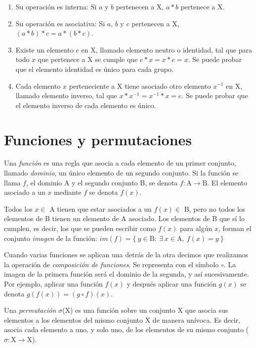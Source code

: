 		\begin{enumerate}
			\item{Su operación es interna: Si $a$ y $b$ pertenecen a X, $a\ast b$ pertenece a X.}		\item{Su operación es asociativa: Si $a$, $b$ y $c$ pertenecen a X, $(a\ast b)\ast c=a\ast(b\ast c)$. }
			\item{Existe un elemento $e$ en X, llamado elemento neutro o identidad, tal que para todo $x$ que pertenece a X se cumple que $e\ast x = x\ast e = x$. Se puede probar que el elemento identidad es único para cada grupo.}
			\item{Cada elemento $x$ perteneciente a X tiene asociado otro elemento $x^{-1}$ en X, llamado elemento inverso, tal que $x \ast x^{-1} = x^{-1}  \ast x = e$. Se puede probar que el elemento inverso de cada elemento es único.}		
		\end{enumerate}
	
	\section{Funciones y permutaciones}
		Una \emph{función} es una regla que asocia a cada elemento de un primer conjunto, llamado \emph{dominio}, un único elemento de un segundo conjunto. Si la función se llama $f$, el dominio A y el segundo conjunto B, se denota $f:\text{A}\to \text{B}$. El elemento asociado a un $x$ mediante $f$ se denota $f(x)$.
		
		Todos los $x\in$ A tienen que estar asociados a un $f(x)\in$ B, pero no todos los elementos de B tienen un elemento de A asociado. Los elementos de B que sí lo cumplen, es decir, los que se pueden escribir como $f(x)$ para algún $x$, forman el conjunto \emph{imagen} de la función: $im(f)=\{\ y\in \text{B}:\ \exists\ x \in \text{A},\ f(x)=y\ \}$
		
		Cuando varias funciones se aplican una detrás de la otra decimos que realizamos la operación de \textit{composición de funciones}. Se representa con el símbolo $\circ$. La imagen de la primera función será el dominio de la segunda, y así sucesivamente. Por ejemplo, aplicar una función $f(x)$ y después aplicar una función $g(x)$ se denota $g(f(x))=(g\circ f)(x)$.
		
		Una \emph{permutación} $\sigma$(X) es una función sobre un conjunto X que asocia sus elementos a los elementos del mismo conjunto X de manera unívoca. Es decir, asocia cada elemento a uno, y solo uno, de los elementos de su mismo conjunto ($\sigma:\text{X}\to \text{X}$).

